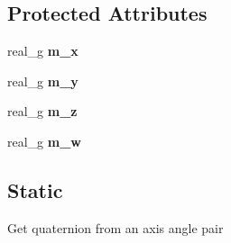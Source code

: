 \subsection*{Protected Attributes}
\begin{DoxyCompactItemize}
\item 
\mbox{\label{classrev_1_1_quaternion_aac19cebbeb8ffb19e891385e9d0f4efe}} 
real\+\_\+g {\bfseries m\+\_\+x}
\item 
\mbox{\label{classrev_1_1_quaternion_a2fdfa72b9a3f7697a89935782c8f69b2}} 
real\+\_\+g {\bfseries m\+\_\+y}
\item 
\mbox{\label{classrev_1_1_quaternion_a6e4d5764933ebb30d9c6f5374e8ac44d}} 
real\+\_\+g {\bfseries m\+\_\+z}
\item 
\mbox{\label{classrev_1_1_quaternion_ad3cbbec76d480734ba9a24b88b64e282}} 
real\+\_\+g {\bfseries m\+\_\+w}
\end{DoxyCompactItemize}
\subsection*{Static}
\label{_amgrp84a8921b25f505d0d2077aeb5db4bc16}%
Get quaternion from an axis angle pair

